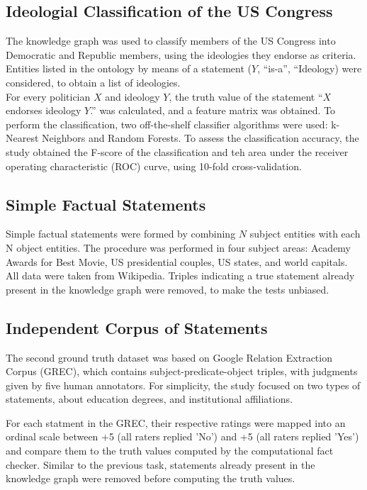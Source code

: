 \documentclass[10pt,11pt,12pt,oneside]{book}
\begin{document}
	\subsection{Ideologial Classification of the US Congress}
	
	The knowledge graph was used to classify members of the US Congress into Democratic and Republic members, using the ideologies they endorse as criteria. Entities listed in the ontology by means of a statement ($Y$, “is-a”, “Ideology) were considered, to obtain a list of ideologies.\\
	
	For every politician $X$ and ideology $Y$, the truth value of the statement “$X$ endorses ideology $Y$.” was calculated, and a feature matrix was obtained. To perform the classification, two off-the-shelf classifier algorithms were used: k-Nearest Neighbors and Random Forests. To assess the classification accuracy, the study obtained the F-score of the classification and teh area under the receiver operating characteristic (ROC) curve, using 10-fold cross-validation.\\
	
	\subsection{Simple Factual Statements}
	Simple factual statements were formed by combining $N$ subject entities with each N object entities. The procedure was performed in four subject areas: Academy Awards for Best Movie, US presidential couples, US states, and world capitals. All data were taken from Wikipedia. Triples indicating a true statement  already present in the knowledge graph were removed, to make the tests unbiased.
	
	\subsection{Independent Corpus of Statements}
	The second ground truth dataset was based on Google Relation Extraction Corpus (GREC), which contains subject-predicate-object triples, with judgments given by five human annotators. For simplicity, the study focused on two types of statements, about education degrees, and institutional affiliations. 
	
	For each statment in the GREC, their respective ratings were mapped into an ordinal scale between +5 (all raters replied 'No') and +5 (all raters replied 'Yes') and compare them to the truth values computed by the computational fact checker. Similar to the previous task, statements already present in the knowledge graph were removed before computing the truth values.
	
\end{document}
